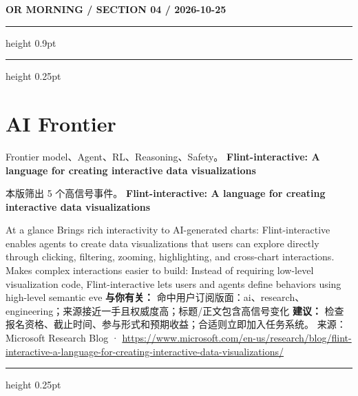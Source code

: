 \documentclass[10.5pt]{ctexart}
\begin{document}
\newpage
{\small\bfseries OR MORNING / SECTION 04 / 2026-10-25}
\vspace{2mm}
\hrule height 0.9pt
\vspace{1.5mm}
\hrule height 0.25pt
\vspace{4mm}
\section*{AI Frontier}
{\color{ormuted} Frontier model、Agent、RL、Reasoning、Safety。}
\vspace{2mm}
{\LARGE\bfseries Flint-interactive: A language for creating interactive data visualizations}\par
\vspace{1mm}
{\color{ormuted} 本版筛出 5 个高信号事件。}
\vspace{3mm}
{\Large\bfseries Flint-interactive: A language for creating interactive data visualizations}\par
At a glance Brings rich interactivity to AI-generated charts: Flint-interactive enables agents to create data visualizations that users can explore directly through clicking, filtering, zooming, highlighting, and cross-chart interactions. Makes complex interactions easier to build: Instead of requiring low-level visualization code, Flint-interactive lets users and agents define behaviors using high-level semantic eve
\textbf{与你有关：} 命中用户订阅版面：ai、research、engineering；来源接近一手且权威度高；标题/正文包含高信号变化
\textbf{建议：} 检查报名资格、截止时间、参与形式和预期收益；合适则立即加入任务系统。
{\footnotesize\color{ormuted} 来源：Microsoft Research Blog · \url{https://www.microsoft.com/en-us/research/blog/flint-interactive-a-language-for-creating-interactive-data-visualizations/}}
\vspace{4mm}
\hrule height 0.25pt
\vspace{3mm}
\end{document}
